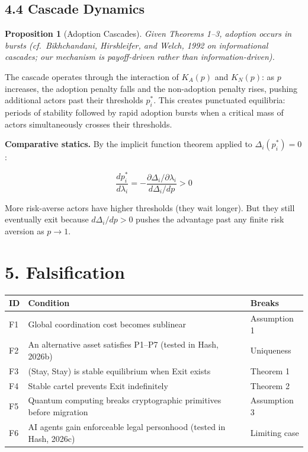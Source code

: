 \documentclass[12pt]{article}
\newtheorem{proposition}{Proposition}
\theoremstyle{definition}
\theoremstyle{remark}
\begin{document}
\subsection{4.4 Cascade Dynamics}

\begin{proposition}[Adoption Cascades]
Given Theorems 1--3, adoption occurs in bursts (cf.\ Bikhchandani,
Hirshleifer, and Welch, 1992 on informational cascades; our mechanism
is payoff-driven rather than information-driven).
\end{proposition}

The cascade operates through the interaction of $K_A(p)$ and $K_N(p)$:
as $p$ increases, the adoption penalty falls and the non-adoption penalty
rises, pushing additional actors past their thresholds $p_i^*$. This
creates punctuated equilibria: periods of stability followed by rapid
adoption bursts when a critical mass of actors simultaneously crosses
their thresholds.

\noindent\textbf{Comparative statics.} By the implicit function theorem applied
to $\Delta_i(p_i^*) = 0$:

\[
\frac{dp_i^*}{d\lambda_i} = -\frac{\partial\Delta_i / \partial\lambda_i}{d\Delta_i / dp} > 0
\]

More risk-averse actors have higher thresholds (they wait longer). But
they still eventually exit because $d\Delta_i/dp > 0$ pushes the advantage
past any finite risk aversion as $p \to 1$.


\section{5. Falsification}

\begin{table}[h]
\centering
\begin{tabularx}{\textwidth}{lXl}
\toprule
ID & Condition & Breaks \\
\midrule
F1 & Global coordination cost becomes sublinear & Assumption 1 \\
F2 & An alternative asset satisfies P1--P7 (tested in Hash, 2026b) & Uniqueness \\
F3 & (Stay, Stay) is stable equilibrium when Exit exists & Theorem 1 \\
F4 & Stable cartel prevents Exit indefinitely & Theorem 2 \\
F5 & Quantum computing breaks cryptographic primitives before migration & Assumption 3 \\
F6 & AI agents gain enforceable legal personhood (tested in Hash, 2026c) & Limiting case \\
\bottomrule
\end{tabularx}
\end{table}
\end{document}
